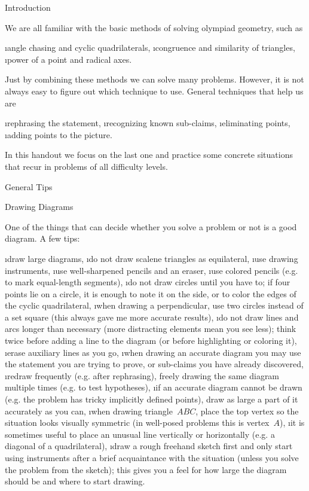 

\let\angle\sphericalangle





\sec Introduction

We are all familiar with the basic methods of solving olympiad geometry, such as

\begitems
\i angle chasing and cyclic quadrilaterals,
\i congruence and similarity of triangles,
\i power of a point and radical axes.
\enditems

Just by combining these methods we can solve many problems. However, it is not always easy to figure out which technique to use. General techniques that help us are

\begitems
\i rephrasing the statement,
\i recognizing known sub-claims,
\i eliminating points,
\i adding points to the picture.
\enditems

In this handout we focus on the last one and practice some concrete situations that recur in problems of all difficulty levels.

\sec General Tips

\secc Drawing Diagrams

One of the things that can decide whether you solve a problem or not is a good diagram. A few tips:

\begitems
\i draw large diagrams,
\i do not draw scalene triangles as equilateral,
\i use drawing instruments,
\i use well-sharpened pencils and an eraser,
\i use colored pencils (e.g. to mark equal-length segments),
\i do not draw circles until you have to; if four points lie on a circle, it is enough to note it on the side, or to color the edges of the cyclic quadrilateral,
\i when drawing a perpendicular, use two circles instead of a set square (this always gave me more accurate results),
\i do not draw lines and arcs longer than necessary (more distracting elements mean you see less); think twice before adding a line to the diagram (or before highlighting or coloring it),
\i erase auxiliary lines as you go,
\i when drawing an accurate diagram you may use the statement you are trying to prove, or sub-claims you have already discovered,
\i redraw frequently (e.g. after rephrasing), freely drawing the same diagram multiple times (e.g. to test hypotheses),
\i if an accurate diagram cannot be drawn (e.g. the problem has tricky implicitly defined points), draw as large a part of it accurately as you can,
\i when drawing triangle~$ABC$, place the top vertex so the situation looks visually symmetric (in well-posed problems this is vertex~$A$),
\i it is sometimes useful to place an unusual line vertically or horizontally (e.g. a diagonal of a quadrilateral),
\i draw a rough freehand sketch first and only start using instruments after a brief acquaintance with the situation (unless you solve the problem from the sketch); this gives you a feel for how large the diagram should be and where to start drawing.
\enditems

